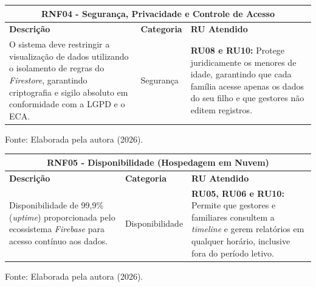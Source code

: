 \begin{quadro}[H]
    \centering
    \caption{RNF04: Segurança, Privacidade e Controle de Acesso}
    \label{quadro:rnf04}
    \renewcommand{\arraystretch}{1.5}
    \begin{tabular}{|p{5.5cm}|p{2.5cm}|p{7cm}|}
        \hline
        \multicolumn{3}{|c|}{\textbf{RNF04 - Segurança, Privacidade e Controle de Acesso}} \\ \hline
        \textbf{Descrição} & \textbf{Categoria} & \textbf{RU Atendido} \\ \hline
        O sistema deve restringir a visualização de dados utilizando o isolamento de regras do \textit{Firestore}, garantindo criptografia e sigilo absoluto em conformidade com a LGPD e o ECA. & Segurança & \textbf{RU08 e RU10:} Protege juridicamente os menores de idade, garantindo que cada família acesse apenas os dados do seu filho e que gestores não editem registros. \\ \hline
    \end{tabular}
    
    \vspace{0.1cm}
    \begin{flushleft}
        \footnotesize Fonte: Elaborada pela autora (2026).
    \end{flushleft}
\end{quadro}

\begin{quadro}[H]
    \centering
    \caption{RNF05: Disponibilidade (Hospedagem em Nuvem)}
    \label{quadro:rnf05}
    \renewcommand{\arraystretch}{1.5}
    \begin{tabular}{|p{5.5cm}|p{2.5cm}|p{7cm}|}
        \hline
        \multicolumn{3}{|c|}{\textbf{RNF05 - Disponibilidade (Hospedagem em Nuvem)}} \\ \hline
        \textbf{Descrição} & \textbf{Categoria} & \textbf{RU Atendido} \\ \hline
        Disponibilidade de 99,9\% (\textit{uptime}) proporcionada pelo ecossistema \textit{Firebase} para acesso contínuo aos dados. & Disponibilidade & \textbf{RU05, RU06 e RU10:} Permite que gestores e familiares consultem a \textit{timeline} e gerem relatórios em qualquer horário, inclusive fora do período letivo. \\ \hline
    \end{tabular}
    
    \vspace{0.1cm}
    \begin{flushleft}
        \footnotesize Fonte: Elaborada pela autora (2026).
    \end{flushleft}
\end{quadro}


